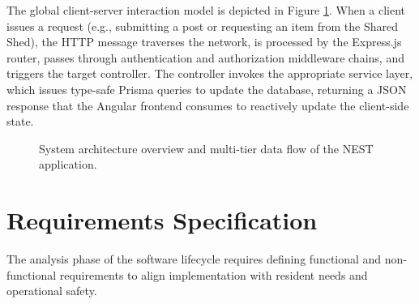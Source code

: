 The global client-server interaction model is depicted in Figure \ref{fig:system-architecture-overview}. When a client issues a request (e.g., submitting a post or requesting an item from the Shared Shed), the HTTP message traverses the network, is processed by the Express.js router, passes through authentication and authorization middleware chains, and triggers the target controller. The controller invokes the appropriate service layer, which issues type-safe Prisma queries to update the database, returning a JSON response that the Angular frontend consumes to reactively update the client-side state.

\begin{figure}[h]
\centering
{}
\caption{System architecture overview and multi-tier data flow of the NEST application.}
\label{fig:system-architecture-overview}
\end{figure}

\section{Requirements Specification}
The analysis phase of the software lifecycle requires defining functional and non-functional requirements to align implementation with resident needs and operational safety.


